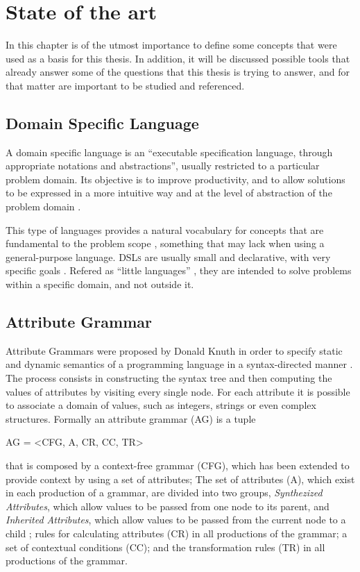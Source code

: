 \chapter{State of the art} \label{state_of_the_art}

In this chapter is of the utmost importance to define some concepts that were used as a basis for this thesis. In addition, it will be discussed possible tools that already answer some of the questions that this thesis is trying to answer, and for that matter are important to be studied and referenced.
	
\section{Domain Specific Language}
A domain specific language is an ``executable specification language, through appropriate notations and abstractions'', usually restricted to a particular problem domain. Its objective is to improve productivity, and to allow solutions to be expressed in a more intuitive way and at the level of abstraction of the problem domain \cite{van_2000}.
	
This type of languages provides a natural vocabulary for concepts that are fundamental to the problem scope \cite{bruce_1997}, something that may lack when using a general-purpose language. \textsc{DSLs} are usually small and declarative, with very specific goals \cite{van_2000}. Refered as ``little languages'' \cite{bentley_1986}, they are intended to solve problems within a specific domain, and not outside it.
	
\section{Attribute Grammar}
Attribute Grammars were proposed by Donald Knuth in order to specify static and dynamic semantics of a programming language in a syntax-directed manner \cite{thirunarayan_2009}. The process consists in constructing the syntax tree and then computing the values of attributes by visiting every single node. For each attribute it is possible to associate a domain of values, such as integers, strings or even complex structures. Formally an attribute grammar (AG) is a tuple \cite{pereira_2016}

AG = \textless CFG, A, CR, CC, TR\textgreater

\noindent that is composed by a context-free grammar (CFG), which has been extended to provide context by using a set of attributes; The set of attributes (A), which exist in each production of a grammar, are divided into two groups, \emph{Synthezized Attributes}, which allow values to be passed from one node to its parent, and \emph{Inherited Attributes}, which allow values to be passed from the current node to a child \cite{slonneger_1995}; rules for calculating attributes (CR) in all productions of the grammar; a set of contextual conditions (CC); and the transformation rules (TR) in all productions of the grammar.

